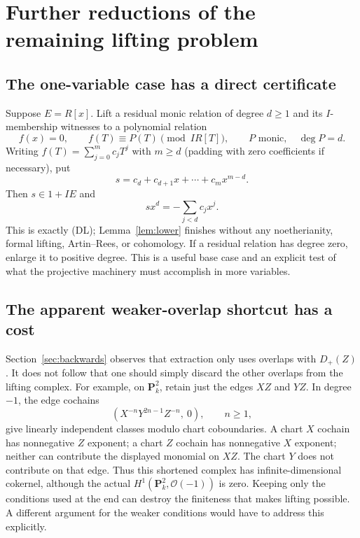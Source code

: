 \documentclass[11pt]{amsart}
\theoremstyle{definition}
\theoremstyle{remark}
\newcommand{\OO}{\mathcal O}
\newcommand{\PP}{\mathbf P}
\begin{document}
\section{Further reductions of the remaining lifting problem}\label{sec:sharper}

\subsection{The one-variable case has a direct certificate}
Suppose $E=R[x]$. Lift a residual monic relation of degree $d\geq1$
and its $I$-membership witnesses to a polynomial relation
\[
 f(x)=0,\qquad f(T)\equiv P(T)\pmod{I R[T]},\qquad P\text{ monic},
 \quad\deg P=d.
\]
Writing $f(T)=\sum_{j=0}^m c_jT^j$ with $m\geq d$ (padding with
zero coefficients if necessary), put
\[
 s=c_d+c_{d+1}x+\cdots+c_mx^{m-d}.
\]
Then $s\in1+IE$ and
\[
 sx^d=-\sum_{j<d}c_jx^j.
\]
This is exactly (DL); Lemma~\ref{lem:lower} finishes without any
noetherianity, formal lifting, Artin--Rees, or cohomology. If a
residual relation has degree zero, enlarge it to positive degree.
This is a useful base case and an explicit test of what the
projective machinery must accomplish in more variables.

\subsection{The apparent weaker-overlap shortcut has a cost}
Section~\ref{sec:backwards} observes that extraction only uses
overlaps with $D_+(Z)$. It does not follow that one should simply
discard the other overlaps from the lifting complex. For example,
on $\PP^2_k$, retain just the edges $XZ$ and $YZ$. In degree $-1$,
the edge cochains
\[
 (X^{-n}Y^{2n-1}Z^{-n},\ 0),\qquad n\geq1,
\]
give linearly independent classes modulo chart coboundaries. A chart
$X$ cochain has nonnegative $Z$ exponent; a chart $Z$ cochain has
nonnegative $X$ exponent; neither can contribute the displayed
monomial on $XZ$. The chart $Y$ does not contribute on that edge.
Thus this shortened complex has infinite-dimensional cokernel,
although the actual $H^1(\PP^2_k,\OO(-1))$ is zero. Keeping only
the conditions used at the end can destroy the finiteness that makes
lifting possible. A different argument for the weaker conditions
would have to address this explicitly.
\end{document}
